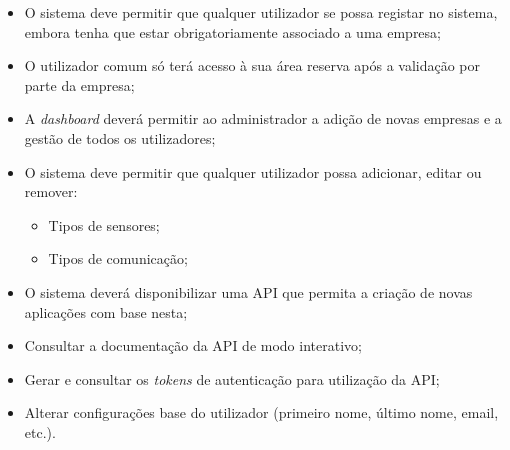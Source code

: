 \begin{itemize}
	\item O sistema deve permitir que qualquer utilizador se possa registar no sistema, embora tenha que estar obrigatoriamente associado a uma empresa;
	
	\item O utilizador comum só terá acesso à sua área reserva após a validação por parte da empresa;
	
	\item A \textit{dashboard} deverá permitir ao administrador a adição de novas empresas e a gestão de todos os utilizadores;
	
	
	\item O sistema deve permitir que qualquer utilizador possa adicionar, editar ou remover: 
	\begin{itemize}
		\item Tipos de sensores; 
		
		\item Tipos de comunicação;
		
		
		
		
		
		
		
	\end{itemize}
	
	
	\item O sistema deverá disponibilizar uma \ac{API} que permita a criação de novas aplicações com base nesta;
	
	\item Consultar a documentação da \ac{API} de modo interativo;
	
	\item Gerar e consultar os \textit{tokens} de autenticação para utilização da \ac{API};
	
	\item Alterar configurações base do utilizador (primeiro nome, último nome, email, etc.).
	
\end{itemize}




